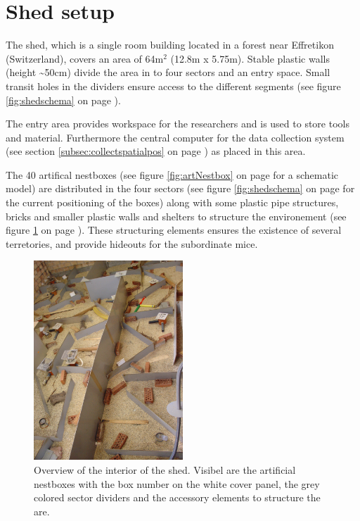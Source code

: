 \newpage
\section{Shed setup}
\label{sec:shedsetup}

The shed, which is a single room building located in a forest near Effretikon (Switzerland), covers an area of 64m$^2$ (12.8m x 5.75m). Stable plastic walls (height \textasciitilde50cm) divide the area in to four sectors and an entry space. Small transit holes in the dividers ensure access to the different segments (see figure \ref{fig:shedschema} on page \pageref{fig:shedschema}).

The entry area provides workspace for the researchers and is used to store tools and material. Furthermore the central computer for the data collection system (see section \ref{subsec:collectspatialpos} on page \pageref{subsec:collectspatialpos}) as placed in this area.

The 40 artifical nestboxes (see figure \ref{fig:artNestbox} on page \pageref{fig:artNestbox} for a schematic model) are distributed in the four sectors (see figure \ref{fig:shedschema} on page \pageref{fig:shedschema} for the current positioning of the boxes) along with some plastic pipe structures, bricks and smaller plastic walls and shelters to structure the environement (see figure \ref{fig:shedoverview} on page \pageref{fig:shedoverview}). These structuring elements ensures the existence of several terretories, and provide hideouts for the subordinate mice.

\begin{figure}[htpb]
\begin{center}
  \includegraphics[width=0.5\textwidth]{assets/pdf/shed_overview.pdf}
  \caption[Interior of the shed]{Overview of the interior of the shed. Visibel are the artificial nestboxes with the box number on the white cover panel, the grey colored sector dividers and the accessory elements to structure the are.}
  \label{fig:shedoverview}
\end{center}
\end{figure}

